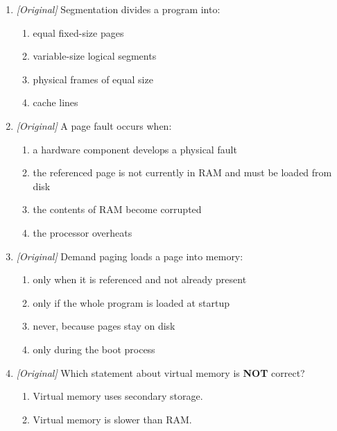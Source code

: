 \documentclass[11pt]{article}
\begin{document}
\begin{enumerate}[label=\textbf{Q\arabic*.}, leftmargin=*]
\begin{enumerate}[label=\Alph*.]
      pages.
    \item Paging divides memory into fixed-size pages and frames; segmentation
      divides a program into variable-size logical segments.
    \item Both paging and segmentation divide memory into equal fixed-size
      blocks.
    \item Segmentation divides memory into equal frames; paging uses
      variable-size logical units.
  \end{enumerate}
\item \textit{[Original]} Segmentation divides a program into:
  \begin{enumerate}[label=\Alph*.]
    \item equal fixed-size pages
    \item variable-size logical segments
    \item physical frames of equal size
    \item cache lines
  \end{enumerate}
\item \textit{[Original]} A page fault occurs when:
  \begin{enumerate}[label=\Alph*.]
    \item a hardware component develops a physical fault
    \item the referenced page is not currently in RAM and must be loaded from
      disk
    \item the contents of RAM become corrupted
    \item the processor overheats
  \end{enumerate}
\item \textit{[Original]} Demand paging loads a page into memory:
  \begin{enumerate}[label=\Alph*.]
    \item only when it is referenced and not already present
    \item only if the whole program is loaded at startup
    \item never, because pages stay on disk
    \item only during the boot process
  \end{enumerate}
\item \textit{[Original]} Which statement about virtual memory is \textbf{NOT}
  correct?
  \begin{enumerate}[label=\Alph*.]
    \item Virtual memory uses secondary storage.
    \item Virtual memory is slower than RAM.

\end{enumerate}
\end{enumerate}
\end{document}
